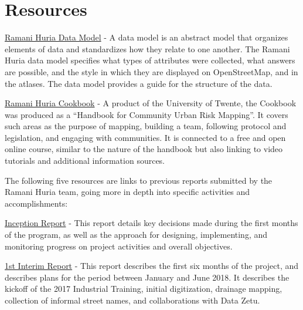\documentclass[a4paper,12pt,twoside]{article}
\begin{document}
\newpage
\section{Resources}

\href{https://wiki.openstreetmap.org/wiki/Dar_es_Salaam/Ramani_Huria}{Ramani Huria Data Model} -
A data model is an abstract model that organizes elements of data and standardizes how they relate to one another. The Ramani Huria data model specifies what types of attributes were collected, what answers are possible, and the style in which they are displayed on OpenStreetMap, and in the atlases. The data model provides a guide for the structure of the data. 


\href{https://resilienceacademy.ac.tz/wp-content/uploads/2019/07/2019-Handbook-for-Community-Urban-Risk-Mapping.pdf}{Ramani Huria Cookbook} -
A product of the University of Twente, the Cookbook was produced as a “Handbook for Community Urban Risk Mapping”. It covers such areas as the purpose of mapping, building a team, following protocol and legislation, and engaging with communities. It is connected to a free and open online course, similar to the nature of the handbook but also linking to video tutorials and additional information sources. 

The following five resources are links to previous reports submitted by the Ramani Huria team, going more in depth into specific activities and accomplishments:


\href{https://drive.google.com/file/d/1CMQ_Aj1QFSSwH9E9CUZdfQ_pzdCj2TTm/view?usp=sharing}{Inception Report} -
This report details key decisions made during the first months of the program, as well as the approach for designing, implementing, and monitoring progress on project activities and overall objectives. 

\href{https://drive.google.com/file/d/1sl3Sc1ADhivcgVU4SUCYMXXm2zuZt8kI/view?usp=sharing}{1st Interim Report} -
This report describes the first six months of the project, and describes plans for the period between January and June 2018. It describes the kickoff of the 2017 Industrial Training, initial digitization, drainage mapping, collection of informal street names, and collaborations with Data Zetu. 
\end{document}
